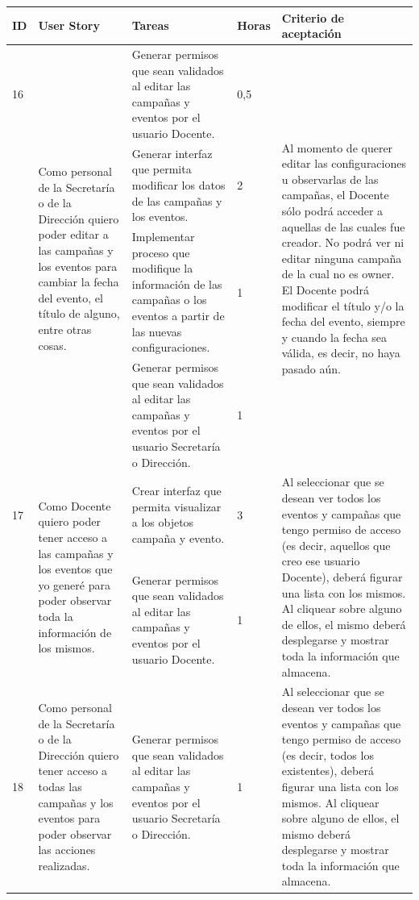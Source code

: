 \documentclass[a4paper, 11pt]{article}
\begin{document}
\begin{table}[H]
\centering
\begin{tabular}{ | p{0.5cm} | p{4cm} | p{5cm} | p{0.85cm} | p{5cm} |}
\hline 
ID & User Story & Tareas & Horas & Criterio de aceptación \\ \hline \hline


16 & \multirow{4}{4cm}{Como personal de la Secretaría o de la Dirección quiero poder editar a las campañas y los eventos para cambiar la fecha del evento, el título de alguno, entre otras cosas.} & Generar permisos que sean validados al editar las campañas y eventos por el usuario Docente. & 0,5  & \multirow{4}{4cm}{Al momento de querer editar las configuraciones u observarlas de las campañas, el Docente sólo podrá acceder a aquellas de las cuales fue creador. No podrá ver ni editar ninguna campaña de la cual no es owner. El Docente podrá modificar el título y/o la fecha del evento, siempre y cuando la fecha sea válida, es decir, no haya pasado aún.} \\ \cline{3-4}
& & Generar interfaz que permita modificar los datos de las campañas y los eventos. & 2 & \\[2cm] \cline{3-4}
& & Implementar proceso que modifique la información de las campañas o los eventos a partir de las nuevas configuraciones. & 1 & \\[2cm] \cline{3-4}
& & Generar permisos que sean validados al editar las campañas y eventos por el usuario Secretaría o Dirección. & 1 & \\ \hline



17 & \multirow{2}{4cm}{Como Docente quiero poder tener acceso a las campañas y los eventos que yo generé para poder observar toda la información de los mismos.} &  Crear interfaz que permita visualizar a los objetos campaña y evento.  & 3 & \multirow{2}{5cm}{ Al seleccionar que se desean ver todos los eventos y campañas que tengo permiso de acceso (es decir, aquellos que creo ese usuario Docente), deberá figurar una lista con los mismos. Al cliquear sobre alguno de ellos, el mismo deberá desplegarse y mostrar toda la información que almacena. } \\[2.5cm] \cline{3-4}
& & Generar permisos que sean validados al editar las campañas y eventos por el usuario Docente. & 1 & \\[2.5cm] \hline



18 & Como personal de la Secretaría o de la Dirección quiero tener acceso a todas las campañas y los eventos para poder observar las acciones realizadas. & Generar permisos que sean validados al editar las campañas y eventos por el usuario Secretaría o Dirección. & 1  & Al seleccionar que se desean ver todos los eventos y campañas que tengo permiso de acceso (es decir, todos los existentes), deberá figurar una lista con los mismos. Al cliquear sobre alguno de ellos, el mismo deberá desplegarse y mostrar toda la información que almacena.  \\ \hline

\end{tabular}
\end{table}
\end{document}
